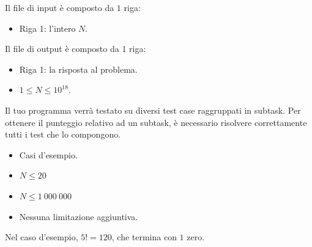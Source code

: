 Il file di input è composto da $1$ riga:
\begin{itemize}
    \item Riga 1: l'intero $N$.
\end{itemize}

Il file di output è composto da $1$ riga:
\begin{itemize}
    \item Riga 1: la risposta al problema.
\end{itemize}


\Constraints

\begin{itemize}[nolistsep, itemsep=2mm]
    \item $1 \le N \le 10^{18}$.
\end{itemize}


\Scoring

Il tuo programma verrà testato su diversi test case raggruppati in subtask.
Per ottenere il punteggio relativo ad un subtask,
è necessario risolvere correttamente tutti i test che lo compongono.

\begin{itemize}[nolistsep,itemsep=2mm]
    \item \subtask Casi d'esempio.
    \item \subtask $N  \le 20$
    \item \subtask $N \le 1\:000\:000$
    \item \subtask Nessuna limitazione aggiuntiva.
\end{itemize}


\Examples

\begin{example}
\end{example}


\Explanation

Nel caso d'esempio, $5! = 120$, che termina con $1$ zero.
